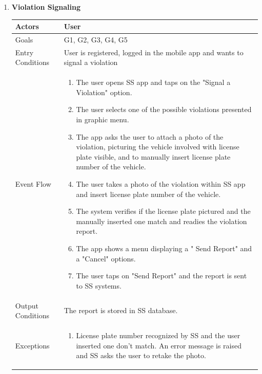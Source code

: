 \begin{enumerate}
	\item \textbf{Violation Signaling}
		\begin{table}[h!]
		\centering
		\begin{tabular}{|l|p{}|}
		\hline
		Actors            			&       	User\\ \hline
		Goals             			&         G1, G2, G3, G4, G5	\\ \hline
		Entry Conditions  	&  		User is registered, logged in the mobile app and wants to signal a violation\\ \hline
		Event Flow        		&          
				\begin{enumerate}[label=\alph*)]
					\item The user opens SS app and taps on the "Signal a Violation" option.
					\item The user selects one of the possible violations presented in graphic menu.
					\item The app asks the user to attach a photo of the violation, picturing the vehicle involved with license plate visible, and to manually insert license plate number of the vehicle.
					\item The user takes a photo of the violation within SS app and insert license plate number of the vehicle.
					\item The system verifies if the license plate pictured and the manually inserted one match and readies the violation report. 
					\item The app shows a menu displaying a " Send Report" and a "Cancel" options.
					\item The user taps on "Send Report" and the report is sent to SS systems.
					\end{enumerate}\\ \hline
		Output Conditions &    		The report is stored in SS database.\\ \hline
		Exceptions        		&       	
				\begin{enumerate}[label=\alph*)]
					\item License plate number recognized by SS and the user inserted one don't match. An error message is raised and SS asks the user to retake the photo.
				\end{enumerate}\\ \hline
	\end{tabular}
	\end{table}
	

\end{enumerate}
